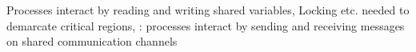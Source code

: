 \documentclass[landscape, a4paper]{article}
\begin{document}
\begin{minipage}[t]{0.19\linewidth}
\begin{betterlist}
Processes interact by reading and writing shared variables, Locking etc. needed to demarcate critical regions, : processes interact by sending and receiving messages on shared communication channels
	\end{betterlist}

\end{minipage}
\end{document}
